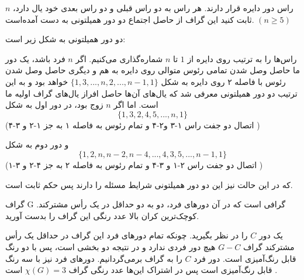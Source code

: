 \documentclass[11pt,largemargins]{h2wp}
\begin{document}
\question

    $n$
     راس دور دایره قرار دارند. هر راس به دو راس قبلی و دو راس بعدی خود یال دارد، ثابت کنید این گراف  از حاصل اجتماع دو دور همیلتونی به دست آمده‌است. $(n \geq 5)$
   
\solution
دو دور همیلتونی به شکل زیر است:

\notes




    راس‌ها را به ترتیب روی دایره از $1$ تا $n$ شماره‌گذاری می‌کنیم. اگر $n$ فرد باشد، یک دور ما حاصل وصل شدن تمامی رئوس متوالی روی دایره به هم و دیگری حاصل وصل شدن رئوس با فاصله ۲ روی دایره به شکل
    $\{1, 3, ..., n, 2, ..., n-1, 1\}$
   خواهد بود و به این ترتیب دو دور همیلتونی  معرفی شد که یال‌های آن‌ها حاصل افراز یال‌های گراف اولیه ما است. اما اگر $n$ زوج بود، در دور اول به شکل
    \[\{1, 3, 2, 4, 5, ..., n, 1\}\]
    (اتصال دو جفت راس ۱-۳ و۲-۴ و تمام رئوس به فاصله ۱ به جز ۱-۲ و ۳-۴ )
    
    و دور دوم به شکل
    \[\{1, 2, n, n-2, n-4, ..., 4, 3, 5, ..., n-1, 1\}\]
     (اتصال دو جفت راس ۲-۱ و ۳-۴ و تمام رئوس به فاصله ۲ به جز ۴-۲ و ۳-۱ )
     
    که در این حالت نیز این دو دور همیلتونی شرایط مسئله را دارند پس حکم ثابت است.
 
 \question
 
			گراف G گرافی است که در آن دور‌های فرد، دو به دو حداقل در یک رأس مشترکند. کوچک‌ترین کران بالا عدد رنگی این گراف را بدست آورید.

\solution

یک دور $C$ را در نظر بگیرید. چونکه تمام دورهای فرد این گراف در حداقل یک رأس مشترکند گراف $G-C$ هیچ دور فردی ندارد و در نتیجه دو بخشی است، پس با دو رنگ قابل رنگ‌آمیزی است.
دور فرد $C$ را به گراف برمی‌گردانیم. دورهای فرد نیز با سه رنگ قابل رنگ‌آمیزی است
 پس در اشتراک این‌ها عدد رنگی گراف
 $\chi (G) = 3$ 
 است
.


\notes
\end{document}
